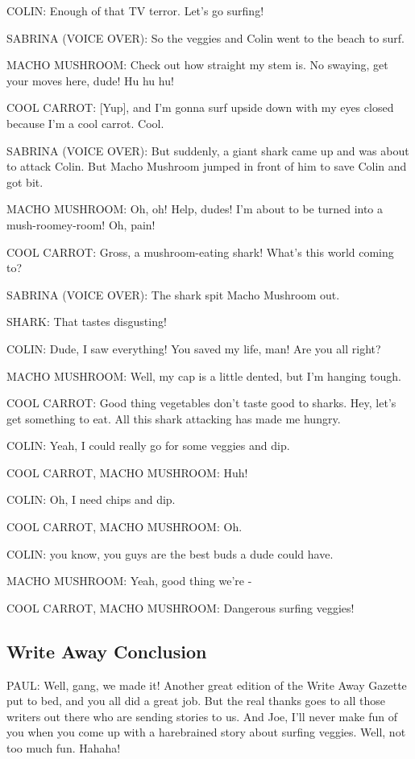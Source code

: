 COLIN:
Enough of that TV terror.
Let's go surfing!

SABRINA (VOICE OVER):
So the veggies and Colin went to the beach to surf.

MACHO MUSHROOM:
Check out how straight my stem is.
No swaying, get your moves here, dude!
Hu hu hu!

COOL CARROT:
[Yup], and I'm gonna surf upside down with my eyes closed because I'm a cool carrot.
Cool.

SABRINA (VOICE OVER):
But suddenly, a giant shark came up and was about to attack Colin.
But Macho Mushroom jumped in front of him to save Colin and got bit.

MACHO MUSHROOM:
Oh, oh!
Help, dudes!
I'm about to be turned into a mush-roomey-room!
Oh, pain!

COOL CARROT:
Gross, a mushroom-eating shark!
What's this world coming to?

SABRINA (VOICE OVER):
The shark spit Macho Mushroom out.

SHARK:
That tastes disgusting!

COLIN:
Dude, I saw everything!
You saved my life, man!
Are you all right?

MACHO MUSHROOM:
Well, my cap is a little dented, but I'm hanging tough.

COOL CARROT:
Good thing vegetables don't taste good to sharks.
Hey, let's get something to eat.
All this shark attacking has made me hungry.

COLIN:
Yeah, I could really go for some veggies and dip.

COOL CARROT, MACHO MUSHROOM:
Huh!

COLIN:
Oh, I need chips and dip.

COOL CARROT, MACHO MUSHROOM:
Oh.

COLIN:
you know, you guys are the best buds a dude could have.

MACHO MUSHROOM:
Yeah, good thing we're -

COOL CARROT, MACHO MUSHROOM:
Dangerous surfing veggies!

\subsection{Write Away Conclusion}

PAUL:
Well, gang, we made it!
Another great edition of the Write Away Gazette put to bed, and you all did a great job.
But the real thanks goes to all those writers out there who are sending stories to us.
And Joe, I'll never make fun of you when you come up with a harebrained story about surfing veggies.
Well, not too much fun.
Hahaha!

